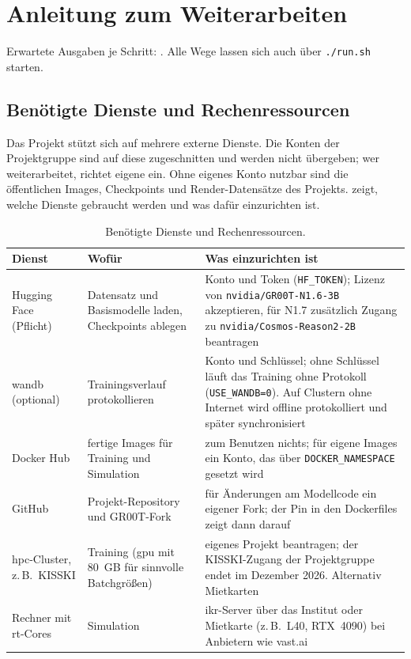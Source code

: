 
\chapter{Anleitung zum Weiterarbeiten}
\label{chap:anleitung}

Erwartete Ausgaben je Schritt: . Alle Wege lassen sich auch über
\texttt{./run.sh} starten.

\section{Benötigte Dienste und Rechenressourcen}
\label{sec:zugaenge}
\label{sec:dienste}

Das Projekt stützt sich auf mehrere externe Dienste. Die Konten der Projektgruppe sind auf
diese zugeschnitten und werden nicht übergeben; wer weiterarbeitet, richtet eigene ein. Ohne
eigenes Konto nutzbar sind die öffentlichen Images, Checkpoints und Render-Datensätze des
Projekts.  zeigt, welche Dienste gebraucht werden und was dafür einzurichten
ist.

\begin{table}[htb]
  \centering
  \small
  \begin{tabularx}{\linewidth}{>{\raggedright\arraybackslash}p{2.6cm}>{\raggedright\arraybackslash}p{3.9cm}>{\raggedright\arraybackslash}X}
    \toprule
    Dienst & Wofür & Was einzurichten ist \\
    \midrule
    Hugging Face (Pflicht) & Datensatz und Basismodelle laden, Checkpoints ablegen & Konto und
      Token (\texttt{HF\_TOKEN}); Lizenz von \texttt{nvidia/GR00T-N1.6-3B} akzeptieren, für
      N1.7 zusätzlich Zugang zu \texttt{nvidia/Cosmos-Reason2-2B} beantragen \\
    \addlinespace
    \acl{wandb} (optional) & Trainingsverlauf protokollieren & Konto und Schlüssel; ohne
      Schlüssel läuft das Training ohne Protokoll (\texttt{USE\_WANDB=0}). Auf Clustern ohne
      Internet wird offline protokolliert und später synchronisiert \\
    \addlinespace
    Docker Hub & fertige Images für Training und Simulation & zum Benutzen nichts; für
      eigene Images ein Konto, das über \texttt{DOCKER\_NAMESPACE} gesetzt wird \\
    \addlinespace
    GitHub & Projekt-Repository und GR00T-Fork & für Änderungen am Modellcode ein eigener
      Fork; der Pin in den Dockerfiles zeigt dann darauf \\
    \addlinespace
    \acs{hpc}-Cluster, z.\,B.\ KISSKI & Training (\acs{gpu} mit 80~GB für sinnvolle
      Batchgrößen) & eigenes Projekt beantragen; der KISSKI-Zugang der Projektgruppe endet im
      Dezember 2026. Alternativ Mietkarten \\
    \addlinespace
    Rechner mit \acs{rt}-Cores & Simulation & \acs{ikr}-Server über das Institut oder
      Mietkarte (z.\,B.\ L40, RTX~4090) bei Anbietern wie vast.ai \\
    \bottomrule
  \end{tabularx}
  \caption{Benötigte Dienste und Rechenressourcen.}
  \label{tab:dienste}
\end{table}

